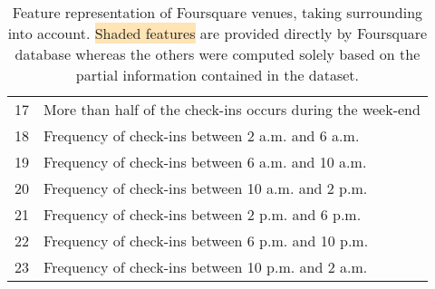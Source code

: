 \begin{table}[hb]
\begin{tabularx}{\textwidth}{lX}
	17 & More than half of the check-ins occurs during the week-end \\
	18 & Frequency of check-ins between 2 a.m. and 6 a.m. \\
	19 & Frequency of check-ins between 6 a.m. and 10 a.m. \\
	20 & Frequency of check-ins between 10 a.m. and 2 p.m. \\
	21 & Frequency of check-ins between 2 p.m. and 6 p.m. \\
	22 & Frequency of check-ins between 6 p.m. and 10 p.m. \\
	23 & Frequency of check-ins between 10 p.m. and 2 a.m. \\
        \bottomrule
    \end{tabularx}
    \caption[Venue features]{Feature representation of Foursquare venues,
	    taking surrounding into account. \colorbox{Moccasin}{Shaded
	    features} are provided directly by Foursquare database whereas the
	    others were computed solely based on the partial information
	    contained in the dataset.\label{tab:venuefeatures}}
\end{table}

\clearpage

